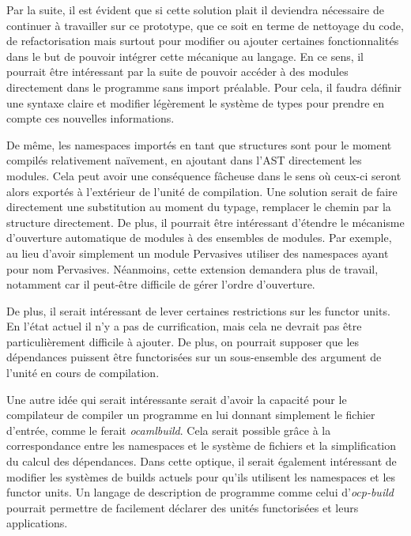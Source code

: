 \documentclass[11pt,a4paper]{report}
\begin{document}
Par la suite, il est évident que si cette solution plait il deviendra nécessaire
de continuer à travailler sur ce prototype, que ce soit en terme de nettoyage du
code, de refactorisation mais surtout pour modifier ou ajouter certaines
fonctionnalités dans le but de pouvoir intégrer cette mécanique au langage. En
ce sens, il pourrait être intéressant par la suite de pouvoir accéder à des
modules directement dans le programme sans import préalable. Pour cela, il
faudra définir une syntaxe claire et modifier légèrement le système de types
pour prendre en compte ces nouvelles informations.

De même, les namespaces importés en tant que structures sont pour le moment
compilés relativement naïvement, en ajoutant dans l'AST directement les
modules. Cela peut avoir une conséquence fâcheuse dans le sens où ceux-ci seront
alors exportés à l'extérieur de l'unité de compilation. Une solution serait de
faire directement une substitution au moment du typage, remplacer le chemin par
la structure directement. De plus, il pourrait être intéressant d'étendre le
mécanisme d'ouverture automatique de modules à des ensembles de modules. Par
exemple, au lieu d'avoir simplement un module Pervasives utiliser des namespaces
ayant pour nom Pervasives. Néanmoins, cette extension demandera plus de travail,
notamment car il peut-être difficile de gérer l'ordre d'ouverture.

De plus, il serait intéressant de lever certaines restrictions sur les functor
units. En l'état actuel il n'y a pas de currification, mais cela ne devrait pas
être particulièrement difficile à ajouter. De plus, on pourrait supposer que les
dépendances puissent être functorisées sur un sous-ensemble des argument de
l'unité en cours de compilation.

Une autre idée qui serait intéressante serait d'avoir la capacité pour le
compilateur de compiler un programme en lui donnant simplement le fichier
d'entrée, comme le ferait \emph{ocamlbuild}. Cela serait possible grâce à la
correspondance entre les namespaces et le système de fichiers et la
simplification du calcul des dépendances. Dans cette optique, il serait
également intéressant de modifier les systèmes de builds actuels pour qu'ils
utilisent les namespaces et les functor units. Un langage de description de
programme comme celui d'\emph{ocp-build} pourrait permettre de facilement
déclarer des unités functorisées et leurs applications.



\end{document}
